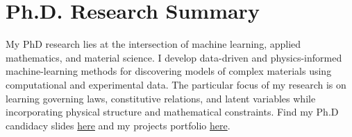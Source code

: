 \section{\sc Ph.D. Research Summary}
My PhD research lies at the intersection of machine learning, applied mathematics, and material science. I develop data-driven and physics-informed machine-learning methods for discovering models of complex materials using computational and experimental data. The particular focus of my research is on learning governing laws, constitutive relations, and latent variables while incorporating physical structure and mathematical constraints. Find my Ph.D candidacy slides \href{https://m-raj.github.io/assets/talks/Candidacy_Talk.pdf}{here} and my projects portfolio \href{https://m-raj.github.io/projects/}{here}.

\endinput